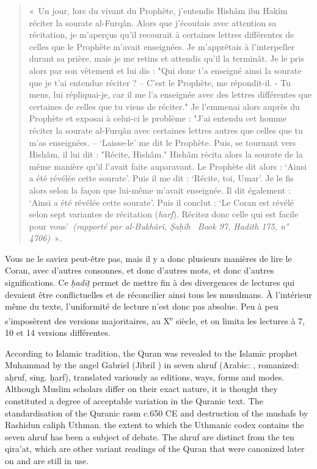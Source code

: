 \begin{quote}
    «~Un jour, lors du vivant du Prophète, j'entendis Hishâm ibn Hakîm
réciter la sourate al-Furqân. Alors que j'écoutais avec attention sa
récitation, je m'aperçus qu'il recourait à certaines lettres différentes
de celles que le Prophète m'avait enseignées. Je m'apprêtais à
l'interpeller durant sa prière, mais je me retins et attendis qu'il la
terminât. Je le pris alors par son vêtement et lui dis : "Qui donc t'a
enseigné ainsi la sourate que je t'ai entendue réciter ? -- C'est le
Prophète, me répondit-il. - Tu mens, lui répliquai-je, car il me l'a
enseignée avec des lettres différentes que certaines de celles que tu
viens de réciter." Je l'emmenai alors auprès du Prophète et exposai à
celui-ci le problème : "J'ai entendu cet homme réciter la sourate
al-Furqân avec certaines lettres autres que celles que tu m'as
enseignées. -- `Laisse-le' me dit le Prophète. Puis, se tournant vers
Hishâm, il lui dit : "Récite, Hishâm." Hishâm récita alors la sourate de
la même manière qu'il l'avait faite auparavant. Le Prophète dit alors :
`Ainsi a été révélée cette sourate'. Puis il me dit : `Récite, toi,
Umar'. Je le fis alors selon la façon que lui-même m'avait enseignée. Il
dit également : `Ainsi a été révélée cette sourate'. Puis il conclut :
`Le Coran est révélé selon sept variantes de récitation (\emph{harf}).
Récitez donc celle qui est facile pour vous'\emph{~(rapporté par
al-Bukhârî, Ṣaḥih ~Book 97, Hadith 175, n° 4706)}~»\emph{.}
\end{quote}


Vous ne le saviez peut-être pas, mais il y a donc plusieurs manières de
lire le Coran, avec d'autres consonnes, et donc d'autres mots, et donc
d'autres significations. Ce \emph{ḥadīṯ} permet de mettre fin à des
divergences de lectures qui devaient être conflictuelles et de
réconcilier ainsi tous les musulmans. À l'intérieur même du texte,
l'uniformité de lecture n'est donc pas absolue. Peu à peu s'imposèrent
des versions majoritaires, au X\textsuperscript{e} siècle, et on limita
les lectures à 7, 10 et 14 versions différentes.

\begin{Def}
According to Islamic tradition, the Quran was revealed to the Islamic prophet Muhammad by the angel Gabriel (Jibril ) in seven ahruf (Arabic: ‎, romanized: aḥruf, sing. ḥarf), translated variously as editions, ways, forms and modes. Although Muslim scholars differ on their exact nature, it is thought they constituted a degree of acceptable variation in the Quranic text. The standardisation of the Quranic rasm c.650 CE and destruction of the mushafs by Rashidun caliph Uthman. the extent to which the Uthmanic codex contains the seven ahruf has been a subject of debate. The ahruf are distinct from the ten qira'at, which are other variant readings of the Quran that were canonized later on and are still in use. 
\end{Def}

